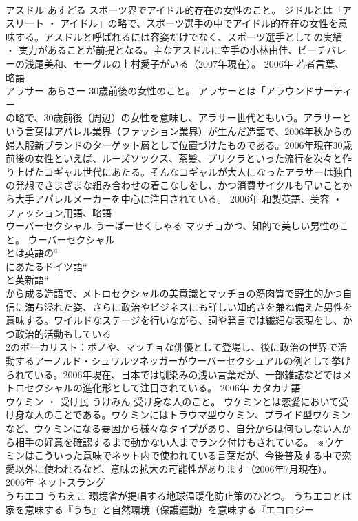 \documentclass[8pt]{extreport}
\begin{document}
\begin{CJK}{UTF8}{min}
\\	アスドル	あすどる	スポーツ界でアイドル的存在の女性のこと。	ジドルとは「アスリート ・ アイドル」の略で、スポーツ選手の中でアイドル的存在の女性を意味する。アスドルと呼ばれるには容姿だけでなく、スポーツ選手としての実績 ・ 実力があることが前提となる。主なアスドルに空手の小林由佳、ビーチバレーの浅尾美和、モーグルの上村愛子がいる（2007年現在）。	2006年	若者言葉、略語	
\\	アラサー	あらさー	30歳前後の女性のこと。	アラサーとは「アラウンドサーティー
\\	の略で、30歳前後（周辺）の女性を意味し、アラサー世代ともいう。アラサーという言葉はアパレル業界（ファッション業界）が生んだ造語で、2006年秋からの婦人服新ブランドのターゲット層として位置づけたものである。2006年現在30歳前後の女性といえば、ルーズソックス、茶髪、プリクラといった流行を次々と作り上げたコギャル世代にあたる。そんなコギャルが大人になったアラサーは独自の発想でさまざまな組み合わせの着こなしをし、かつ消費サイクルも早いことから大手アパレルメーカーを中心に注目されている。	2006年	和製英語、美容 ・ ファッション用語、略語	
\\	ウーバーセクシャル	うーばーせくしゃる	マッチョかつ、知的で美しい男性のこと。	ウーバーセクシャル
\\	とは英語の“
\\	にあたるドイツ語“
\\	と英新語“
\\	から成る造語で、メトロセクシャルの美意識とマッチョの筋肉質で野生的かつ自信に満ち溢れた姿、さらに政治やビジネスにも詳しい知的さを兼ね備えた男性を意味する。ワイルドなステージを行いながら、詞や発言では繊細な表現をし、かつ政治的活動もしている
\\	2のボーカリスト：ボノや、マッチョな俳優として登場し、後に政治の世界で活動するアーノルド・シュワルツネッガーがウーバーセクシュアルの例として挙げられている。2006年現在、日本では馴染みの浅い言葉だが、一部雑誌などではメトロセクシャルの進化形として注目されている。	2006年	カタカナ語	
\\	ウケミン ・ 受け民	うけみん	受け身な人のこと。	ウケミンとは恋愛において受け身な人のことである。ウケミンにはトラウマ型ウケミン、プライド型ウケミンなど、ウケミンになる要因から様々なタイプがあり、自分からは何もしない人から相手の好意を確認するまで動かない人までランク付けもされている。 ※ウケミンはこういった意味でネット内で使われている言葉だが、今後普及する中で恋愛以外に使われるなど、意味の拡大の可能性があります（2006年7月現在）。	2006年	ネットスラング	
\\	うちエコ	うちえこ	環境省が提唱する地球温暖化防止策のひとつ。	うちエコとは家を意味する『うち』と自然環境（保護運動）を意味する『エコロジー

\end{CJK}
\end{document}
